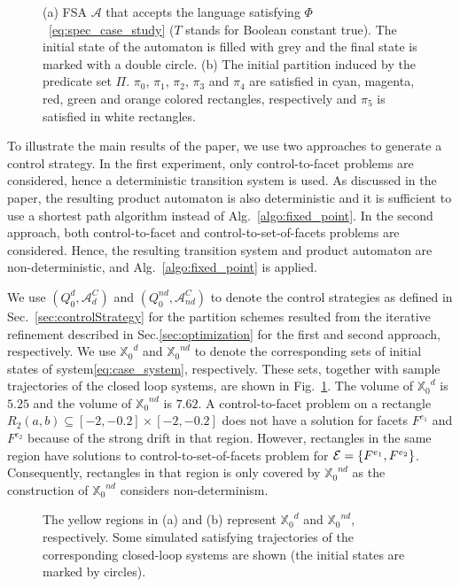 \documentclass{ifacconf}
\newcommand{\XO}{\ensuremath{\mathbb{X}_0}}
\newcommand{\AUTOMATON}{\ensuremath{\mathcal{A}}}
\newcommand{\Fset}{{\cal E}}
\newcommand{\PREDSET}{\ensuremath{\Pi}}
\begin{document}
\begin{figure}
\centering
{}
\caption{(a) FSA $\AUTOMATON$ that accepts the language satisfying $\Phi$~\eqref{eq:spec_case_study} ($T$ stands for Boolean constant true). The initial state of the automaton is filled with grey and the final state is marked with a double circle. (b) The initial partition induced by the predicate set $\PREDSET$. $\pi_0$, $\pi_1$, $\pi_2$, $\pi_3$ and $\pi_4$ are satisfied in cyan, magenta, red, green and orange colored rectangles, respectively and $\pi_5$ is satisfied in white rectangles.}
\end{figure} 

To illustrate the main results of the paper, we use two approaches to generate a control strategy. In the first experiment, only control-to-facet problems are considered, hence a deterministic transition system is used.
As discussed in the paper, the resulting product automaton is also deterministic and it is sufficient to use a shortest path algorithm instead of Alg.~\ref{algo:fixed_point}. 
In the second approach, both control-to-facet and control-to-set-of-facets problems are considered. Hence, the resulting transition system and product automaton are non-deterministic, and Alg.~\ref{algo:fixed_point} is applied.

We use $(Q_0^d,\AUTOMATON^C_{d})$ and $(Q_0^{nd}, \AUTOMATON^C_{nd})$ to denote the control strategies as defined in Sec.~\ref{sec:controlStrategy} for the partition schemes resulted from the iterative refinement described in Sec.\ref{sec:optimization} for the first and second approach, respectively. We use $\XO^{d}$ and $\XO^{nd}$ to denote the corresponding sets of initial states of system\eqref{eq:case_system}, respectively. 
These sets, together with sample trajectories of the closed loop systems, are shown in Fig.~\ref{fig:sim}. 
The volume of $\XO^d$ is $5.25$ and the volume of $\XO^{nd}$ is $7.62$. 
A control-to-facet problem on a rectangle $R_2(a,b) \subseteq [-2,-0.2]\times [-2,-0.2]$ does not have a solution for facets $F^{e_1}$ and $F^{e_2}$ because of the strong drift in that region. However, rectangles in the same region have solutions to control-to-set-of-facets problem for $\Fset = \{F^{e_1}, F^{e_2}\}$. Consequently, rectangles in that region is only covered by $\XO^{nd}$ as the construction of $\XO^{nd}$ considers non-determinism.


\begin{figure}[h]
\centering

\caption{The yellow regions in (a) and (b) represent $\XO^d$ and $\XO^{nd}$, respectively. Some simulated satisfying trajectories of the corresponding closed-loop systems are shown (the initial states are marked by circles).}
\label{fig:sim}
\end{figure}
\end{document}
